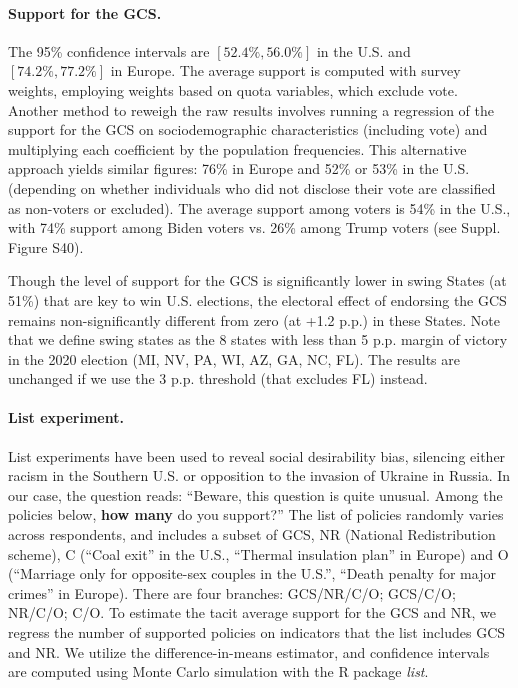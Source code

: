 \begin{small}
\paragraph{\small Support for the GCS.} 
The 95\% confidence intervals are $[52.4\%, 56.0\%]$ in the U.S. and $[74.2\%, 77.2\%]$ in Europe. The average support is computed with survey weights, employing weights based on quota variables, which exclude vote. Another method to reweigh the raw results involves running a regression of the support for the GCS on sociodemographic characteristics (including vote) and multiplying each coefficient by the population frequencies. This alternative approach yields similar figures: 76\% in Europe and 52\% or 53\% in the U.S. (depending on whether individuals who did not disclose their vote are classified as non-voters or excluded). The average support among voters is 54\% in the U.S., with 74\% support among Biden voters vs. 26\% among Trump voters (see Suppl. Figure S40). %

Though the level of support for the GCS is significantly lower in swing States (at 51\%) that are key to win U.S. elections, the electoral effect of endorsing the GCS remains non-significantly different from zero (at +1.2 p.p.) in these States. Note that we define swing states as the 8 states with less than 5 p.p. margin of victory in the 2020 election (MI, NV, PA, WI, AZ, GA, NC, FL). The results are unchanged if we use the 3 p.p. threshold (that excludes FL) instead. 

\paragraph{\small List experiment.} %
List experiments have been used to reveal social desirability bias, silencing either racism in the Southern U.S.\citep{kuklinski_racial_1997} or opposition to the invasion of Ukraine in Russia.\citep{chapkovski_solid_2022} %
In our case, the question reads: ``Beware, this question is quite unusual. Among the policies below, \textbf{how many} do you support?'' The list of policies randomly varies across respondents, and includes a subset of GCS, NR (National Redistribution scheme), C (``Coal exit'' in the U.S., ``Thermal insulation plan'' in Europe) and O (``Marriage only for opposite-sex couples in the U.S.'', ``Death penalty for major crimes'' in Europe). There are four branches: GCS/NR/C/O; GCS/C/O; NR/C/O; C/O. To estimate the tacit average support for the GCS and NR, we regress the number of supported policies on indicators that the list includes GCS and NR.
We utilize the difference-in-means estimator, and confidence intervals are computed using Monte Carlo simulation with the R package \textit{list}.\citep{imai_multivariate_2011}


\end{small}
